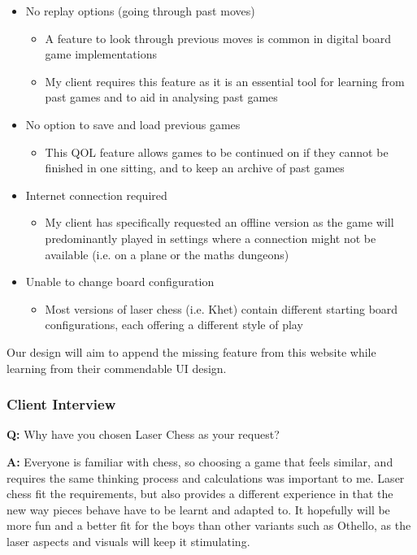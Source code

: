 \documentclass[../main/main.tex]{subfiles}
\begin{document}
\begin{itemize}
\item No replay options (going through past moves)
    \begin{itemize}
    \item A feature to look through previous moves is common in digital board game implementations
    \item My client requires this feature as it is an essential tool for learning from past games and to aid in analysing past games
    \end{itemize}
\item No option to save and load previous games
    \begin{itemize}
    \item This QOL feature allows games to be continued on if they cannot be finished in one sitting, and to keep an archive of past games
    \end{itemize}
\item Internet connection required
    \begin{itemize}
    \item My client has specifically requested an offline version as the game will predominantly played in settings where a connection might not be available (i.e. on a plane or the maths dungeons)
    \end{itemize}
\item Unable to change board configuration
    \begin{itemize}
    \item Most versions of laser chess (i.e. Khet) contain different starting board configurations, each offering a different style of play
    \end{itemize}
\end{itemize}
Our design will aim to append the missing feature from this website while learning from their commendable UI design.

\subsubsection{Client Interview}

\textbf{Q:} Why have you chosen Laser Chess as your request?

\noindent\textbf{A:} Everyone is familiar with chess, so choosing a game that feels similar, and requires the same thinking process and calculations was important to me. Laser chess fit the requirements, but also provides a different experience in that the new way pieces behave have to be learnt and adapted to. It hopefully will be more fun and a better fit for the boys than other variants such as Othello, as the laser aspects and visuals will keep it stimulating.
\end{document}
